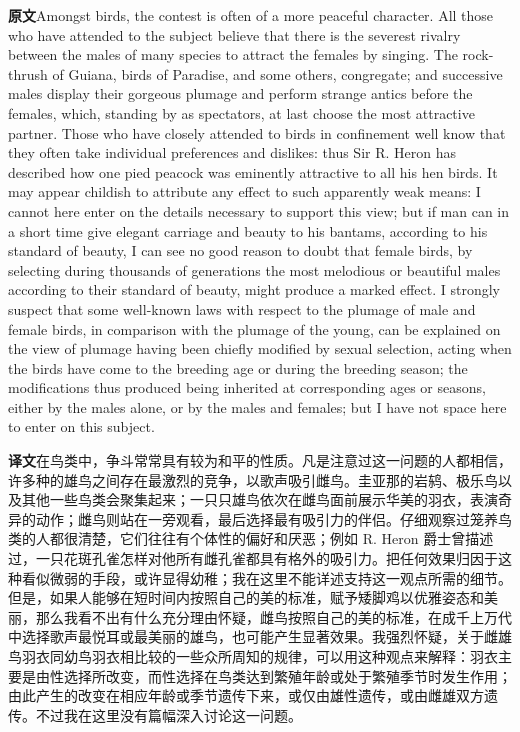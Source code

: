 \documentclass[UTF8,zihao=-4]{ctexart}
\newcommand{\BodyFont}{\fontsize{10.5pt}{15.5pt}\selectfont}
\newcommand{\origlabel}{\textbf{原文}\quad}
\newcommand{\translabel}{\textbf{译文}\quad}
\newenvironment{enblock}{\par\noindent\begingroup\BodyFont\origlabel}{\par\endgroup}
\newenvironment{zhblock}{\par\noindent\begingroup\BodyFont\translabel}{\par\endgroup\vspace{0.35em}}
\newcommand{\pair}[2]{\begin{enblock}#1\end{enblock}\begin{zhblock}#2\end{zhblock}}
\begin{document}
\pair{Amongst birds, the contest is often of a more peaceful character. All those who have attended to the subject believe that there is the severest rivalry between the males of many species to attract the females by singing. The rock-thrush of Guiana, birds of Paradise, and some others, congregate; and successive males display their gorgeous plumage and perform strange antics before the females, which, standing by as spectators, at last choose the most attractive partner. Those who have closely attended to birds in confinement well know that they often take individual preferences and dislikes: thus Sir R. Heron has described how one pied peacock was eminently attractive to all his hen birds. It may appear childish to attribute any effect to such apparently weak means: I cannot here enter on the details necessary to support this view; but if man can in a short time give elegant carriage and beauty to his bantams, according to his standard of beauty, I can see no good reason to doubt that female birds, by selecting during thousands of generations the most melodious or beautiful males according to their standard of beauty, might produce a marked effect. I strongly suspect that some well-known laws with respect to the plumage of male and female birds, in comparison with the plumage of the young, can be explained on the view of plumage having been chiefly modified by sexual selection, acting when the birds have come to the breeding age or during the breeding season; the modifications thus produced being inherited at corresponding ages or seasons, either by the males alone, or by the males and females; but I have not space here to enter on this subject.}{在鸟类中，争斗常常具有较为和平的性质。凡是注意过这一问题的人都相信，许多种的雄鸟之间存在最激烈的竞争，以歌声吸引雌鸟。圭亚那的岩鸫、极乐鸟以及其他一些鸟类会聚集起来；一只只雄鸟依次在雌鸟面前展示华美的羽衣，表演奇异的动作；雌鸟则站在一旁观看，最后选择最有吸引力的伴侣。仔细观察过笼养鸟类的人都很清楚，它们往往有个体性的偏好和厌恶；例如 R. Heron 爵士曾描述过，一只花斑孔雀怎样对他所有雌孔雀都具有格外的吸引力。把任何效果归因于这种看似微弱的手段，或许显得幼稚；我在这里不能详述支持这一观点所需的细节。但是，如果人能够在短时间内按照自己的美的标准，赋予矮脚鸡以优雅姿态和美丽，那么我看不出有什么充分理由怀疑，雌鸟按照自己的美的标准，在成千上万代中选择歌声最悦耳或最美丽的雄鸟，也可能产生显著效果。我强烈怀疑，关于雌雄鸟羽衣同幼鸟羽衣相比较的一些众所周知的规律，可以用这种观点来解释：羽衣主要是由性选择所改变，而性选择在鸟类达到繁殖年龄或处于繁殖季节时发生作用；由此产生的改变在相应年龄或季节遗传下来，或仅由雄性遗传，或由雌雄双方遗传。不过我在这里没有篇幅深入讨论这一问题。}
\end{document}

